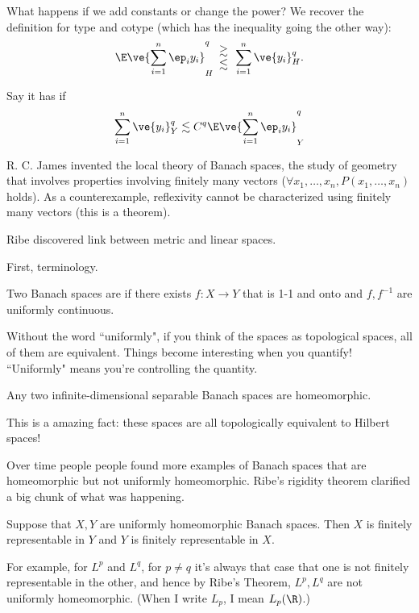 What happens if we add constants or change the power? We recover the definition for type and cotype (which has the inequality going the other way):
\[
\E\ve{\sum_{i=1}^n \ep_i y_i}_H^q \begin{array}{c}
\gtrsim\\
\lesssim
\end{array} \sum_{i=1}^n \ve{y_i}_H^q.
\]

\begin{df}
Say it has  if
\[
\sum_{i=1}^n \ve{y_i}_Y^q \lesssim C^q \E \ve{\sum_{i=1}^n \ep_i y_i}_Y^q
\]
\end{df}
R. C. James invented the local theory of Banach spaces, the study of geometry that involves properties involving finitely many vectors ($\forall x_1,\ldots, x_n, P(x_1,\ldots, x_n)$ holds). As a counterexample, reflexivity cannot be characterized using finitely many vectors (this is a theorem).

Ribe discovered link between metric and linear spaces.

First, terminology.

\begin{df}
Two Banach spaces are  if there exists $f:X\to Y$ that is 1-1 and onto and $f,f^{-1}$ are uniformly continuous. 
\end{df}

Without the word ``uniformly", if you think of the spaces as topological spaces, all of them are equivalent. Things become interesting when you quantify! ``Uniformly" means you're controlling the quantity.
\begin{thm}[Kadec]
Any two infinite-dimensional separable Banach spaces are homeomorphic.
\end{thm}
This is a amazing fact: these spaces are all topologically equivalent to Hilbert spaces!

Over time people people found more examples of Banach spaces that are homeomorphic but not uniformly homeomorphic. Ribe's rigidity theorem clarified a big chunk of what was happening.

\begin{thm}
Suppose that $X,Y$ are uniformly homeomorphic Banach spaces.  Then $X$ is finitely representable in $Y$ and $Y$ is finitely representable in $X$.
\end{thm} 
For example, for $L^p$ and $L^q$, for $p\ne q$ it's always that case that one is not finitely representable in the other, and hence by Ribe's Theorem, $L^p,L^q$ are not uniformly homeomorphic.
(When I write $L_p$, I mean $L_p(\R)$.)

